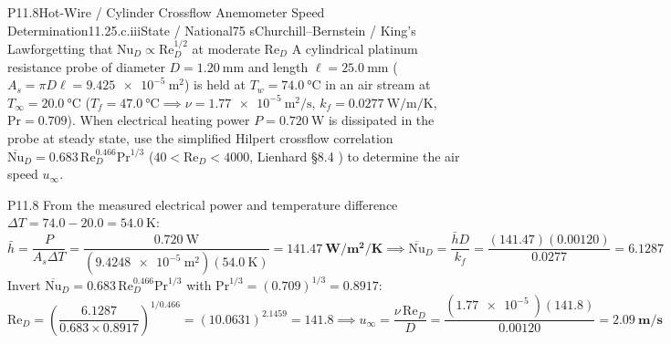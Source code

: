 \begin{problem}{P11.8}{Hot-Wire / Cylinder Crossflow Anemometer Speed Determination}{11.2}{5.c.iii}{State / National}{75 s}{Churchill--Bernstein / King's Law}{forgetting that $\mathrm{Nu}_D \propto \mathrm{Re}_D^{1/2}$ at moderate $\mathrm{Re}_D$}
A cylindrical platinum resistance probe of diameter $D = \SI{1.20}{\milli\meter}$ and length $\ell = \SI{25.0}{\milli\meter}$ ($A_s = \pi D\ell = \SI{9.425e-5}{\square\meter}$) is held at $T_w = \SI{74.0}{\celsius}$ in an air stream at $T_\infty = \SI{20.0}{\celsius}$ ($T_f = \SI{47.0}{\celsius} \implies \nu = \SI{1.77e-5}{\square\meter\per\second}$, $k_f = \SI{0.0277}{\watt\per\meter\per\kelvin}$, $\mathrm{Pr} = 0.709$). When electrical heating power $P = \SI{0.720}{\watt}$ is dissipated in the probe at steady state, use the simplified Hilpert crossflow correlation $\overline{\mathrm{Nu}}_D = 0.683\,\mathrm{Re}_D^{0.466}\mathrm{Pr}^{1/3}$ ($40 < \mathrm{Re}_D < 4000$, Lienhard §8.4 ) to determine the air speed $u_\infty$.
\end{problem}
\begin{solution}{P11.8}
From the measured electrical power and temperature difference $\Delta T = 74.0 - 20.0 = \SI{54.0}{\kelvin}$:
\[
  \bar{h} = \frac{P}{A_s \Delta T} = \frac{\SI{0.720}{\watt}}{(\SI{9.4248e-5}{\square\meter})(\SI{54.0}{\kelvin})} = \mathbf{\SI{141.47}{\watt\per\square\meter\per\kelvin}} \implies
  \overline{\mathrm{Nu}}_D = \frac{\bar{h} D}{k_f} = \frac{(141.47)(0.00120)}{0.0277} = \mathbf{6.1287}
\]
Invert $\overline{\mathrm{Nu}}_D = 0.683\,\mathrm{Re}_D^{0.466}\mathrm{Pr}^{1/3}$ with $\mathrm{Pr}^{1/3} = (0.709)^{1/3} = 0.8917$:
\[
  \mathrm{Re}_D = \left(\frac{6.1287}{0.683 \times 0.8917}\right)^{\!1/0.466} = (10.0631)^{2.1459} = \mathbf{141.8} \implies
  u_\infty = \frac{\nu\,\mathrm{Re}_D}{D} = \frac{(\SI{1.77e-5}{})(141.8)}{0.00120} = \mathbf{\SI{2.09}{\meter\per\second}}
\]
\end{solution}

